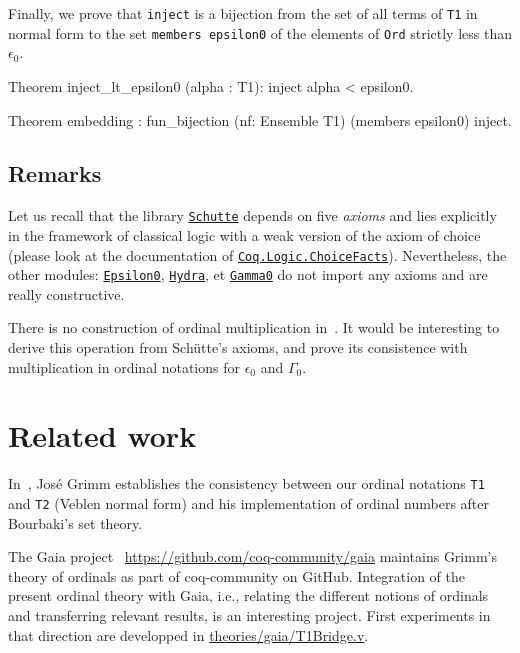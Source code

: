 {Finally, we prove that \texttt{inject} is a bijection from the set of all terms of \texttt{T1} in normal form to the set 
\texttt{members epsilon0} of the elements of \texttt{Ord} strictly less than  $\epsilon_0$.

\begin{Coqsrc}
Theorem inject_lt_epsilon0 (alpha : T1):
      inject alpha < epsilon0.

Theorem embedding : 
     fun_bijection (nf: Ensemble T1)  (members epsilon0) inject.
 \end{Coqsrc}

\subsection{Remarks}
Let us recall that the library \href{../theories/html/hydras.Schutte.Schutte.html}%
{\texttt{Schutte}} depends on five \emph{axioms} and lies explicitly in the  
framework of classical logic with a weak version of the axiom of choice
(please look at the documentation of
\href{https://coq.inria.fr/distrib/current/stdlib/Coq.Logic.ChoiceFacts.html}{\texttt{Coq.Logic.ChoiceFacts}}).
Nevertheless, the other modules:
\href{../theories/html/hydras.Epsilon0.Epsilon0.html}%
{\texttt{Epsilon0}},
\href{../theories/html/hydras.Hydra.Hydra.html}%
{\texttt{Hydra}}, et 
\href{../theories/html/hydras.Gamma0.Gamma0.html}%
{\texttt{Gamma0}}
do not import any axioms and are really constructive.

\begin{project}
There is no construction of ordinal multiplication in~\cite{schutte}. 
It would be interesting to derive this operation from Schütte's axioms,
and prove its consistence with multiplication in ordinal notations for 
$\epsilon_0$ and $\Gamma_0$.
\end{project}

\section{Related work}

In~\cite{grimm:hal-00911710}, José Grimm establishes the consistency between our ordinal notations \texttt{T1} and \texttt{T2} (Veblen normal form) and his implementation
of ordinal numbers after Bourbaki's set theory.

The Gaia project ~\url{https://github.com/coq-community/gaia} maintains Grimm's  theory of ordinals as part of coq-community on GitHub. Integration
of the present ordinal theory with Gaia, i.e., relating the different notions of ordinals
and transferring relevant results, is an interesting project.
First experiments in that direction are developped in
\href{https://github.com/coq-community/hydra-battles/blob/master/theories/gaia/T1Bridge.v}{theories/gaia/T1Bridge.v}.




}
